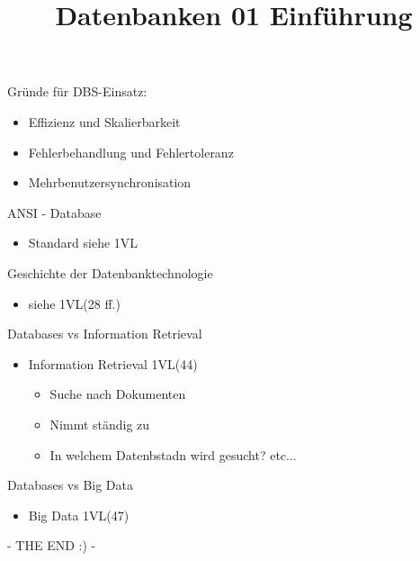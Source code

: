 \documentclass[a4paper, 12pt] {article} %
\title{Datenbanken 01 Einführung}
\begin{document}
\maketitle

Gründe für DBS-Einsatz:
\begin{itemize}
\item Effizienz und Skalierbarkeit
\item Fehlerbehandlung und Fehlertoleranz
\item Mehrbenutzersynchronisation
\end{itemize}

ANSI - Database
\begin{itemize}
\item Standard siehe 1VL
\end{itemize}

Geschichte der Datenbanktechnologie
\begin{itemize}
\item siehe 1VL(28 ff.)
\end{itemize}


Databases vs Information Retrieval
\begin{itemize}
\item Information Retrieval 1VL(44)
\begin{itemize}
\item Suche nach Dokumenten
\item Nimmt ständig zu
\item In welchem Datenbstadn wird gesucht? etc...
\end{itemize}
\end{itemize}

Databases vs Big Data
\begin{itemize}
\item Big Data 1VL(47)
\end{itemize}

- THE END  :) - 

\begin{lstlisting}

\end{lstlisting}
\end{document}
